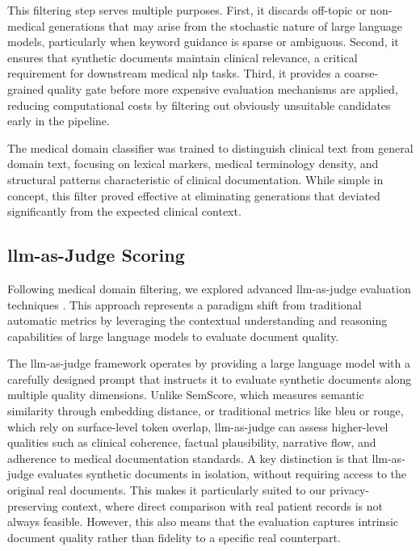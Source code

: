 This filtering step serves multiple purposes. First, it discards off-topic or non-medical generations that may arise from the stochastic nature of large language models, particularly when keyword guidance is sparse or ambiguous. Second, it ensures that synthetic documents maintain clinical relevance, a critical requirement for downstream medical \gls{nlp} tasks. Third, it provides a coarse-grained quality gate before more expensive evaluation mechanisms are applied, reducing computational costs by filtering out obviously unsuitable candidates early in the pipeline.

The medical domain classifier was trained to distinguish clinical text from general domain text, focusing on lexical markers, medical terminology density, and structural patterns characteristic of clinical documentation. While simple in concept, this filter proved effective at eliminating generations that deviated significantly from the expected clinical context.

\subsection{\gls{llm}-as-Judge Scoring}

Following medical domain filtering, we explored advanced \gls{llm}-as-judge evaluation techniques \cite{archit2024criticalevaluation,lee2024selfjudge}. This approach represents a paradigm shift from traditional automatic metrics by leveraging the contextual understanding and reasoning capabilities of large language models to evaluate document quality.

The \gls{llm}-as-judge framework operates by providing a large language model with a carefully designed prompt that instructs it to evaluate synthetic documents along multiple quality dimensions. Unlike SemScore, which measures semantic similarity through embedding distance, or traditional metrics like \gls{bleu} or \gls{rouge}, which rely on surface-level token overlap, \gls{llm}-as-judge can assess higher-level qualities such as clinical coherence, factual plausibility, narrative flow, and adherence to medical documentation standards.
A key distinction is that \gls{llm}-as-judge evaluates synthetic documents in isolation, without requiring access to the original real documents. This makes it particularly suited to our privacy-preserving context, where direct comparison with real patient records is not always feasible. However, this also means that the evaluation captures intrinsic document quality rather than fidelity to a specific real counterpart.

